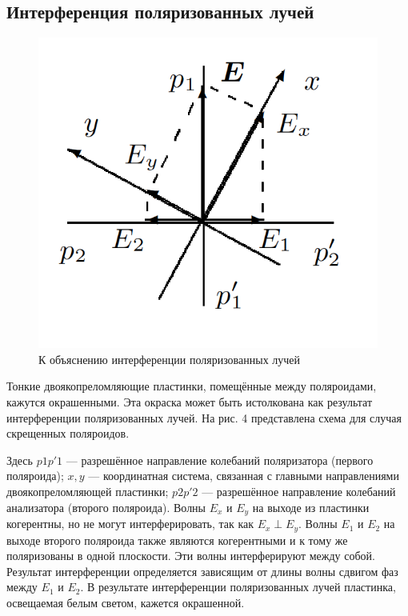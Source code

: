 \documentclass[a4paper, 12pt]{article}
\begin{document}
\subsection{Интерференция поляризованных лучей}

\begin{figure}
	\includegraphics[width=\linewidth]{4.png}
	\caption{К объяснению интерференции
поляризованных лучей}
	\label{ris 4}
\end{figure}


Тонкие двоякопреломляющие пластинки, помещённые между поляроидами, кажутся окрашенными. Эта окраска может быть истолкована как результат интерференции поляризованных лучей. На рис. 4 представлена схема для
случая скрещенных поляроидов.

Здесь $ p1p'1 $ --- разрешённое направление колебаний поляризатора
(первого поляроида); $ x, y $ --- координатная система, связанная с главными направлениями двоякопреломляющей пластинки; $ p2p'2 $ --- разрешённое направление колебаний анализатора (второго поляроида). Волны
$ E_x  $ и $ E_y $ на выходе из пластинки когерентны, но не могут интерферировать, так как $ E_x \perp  E_y $. Волны $ E_1 $ и $ E_2 $ на выходе второго поляроида
также являются когерентными и к тому же поляризованы в одной плоскости. Эти волны интерферируют между собой. Результат интерференции определяется зависящим от длины волны сдвигом фаз между $ E_1 $
и $ E_2 $. В результате интерференции поляризованных лучей пластинка, освещаемая белым светом, кажется окрашенной.
\end{document}
